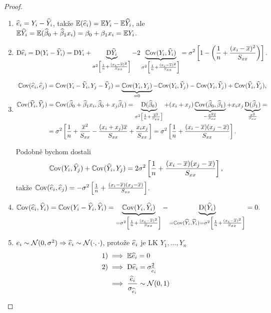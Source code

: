 \begin{proof}
\begin{enumerate}
	\item $\hei = Y_i - \hYi$, takže $\E(\hei) = \E Y_i - \E \hYi$, ale $\E \hYi = \E(\model) = \beta_0 + \beta_1 x_i = \E Y_i$.
	\item
	 $$
		\D \hei = \D (Y_i - \hYi) = \D Y_i + \underbrace{\D \hYi}_{\sigma^2 \left[\frac{1}{n} + \frac{(x_i - \hx)^2}{\Sxx} \right]} - 2 \underbrace{\Cov(Y_i, \hYi)}_{\sigma^2 \left[\frac{1}{n} + \frac{(x_i - \hx)^2}{\Sxx} \right]} = \sigma^2 \left[1 - \left(\frac{1}{n} + \frac{(x_i - \hx)^2}{\Sxx} \right) \right].
	 $$
	\item
	\begin{align*}
		\Cov(\hei, \hej) & = \Cov(Y_i - \hYi, Y_j - \hYj) = \underbrace{\Cov(Y_i, Y_j)}_{ = 0} - \Cov(Y_i, \hYj) - \Cov(Y_i, \hYj) + \Cov(\hYi, \hYj), \\
		\Cov(\hYi, \hYj) & = \Cov(\model, \wbeta_0 + x_j \wbeta_1) = \underbrace{\D(\wbeta_0)}_{\sigma^2 \left[\frac{1}{n} + \frac{\hx^2}{\Sxx} \right]} + (x_i + x_j) \underbrace{\Cov (\wbeta_0,\wbeta_1)}_{-\frac{\sigma^2 \hx}{\Sxx}} + x_i x_j \underbrace{\D(\wbeta_1)}_{\frac{\sigma^2}{\Sxx}} = \\
		& = \sigma^2 \left[\frac{1}{n} + \frac{\hx^2}{\Sxx} - \frac{(x_i + x_j) \hx}{\Sxx} + \frac{x_i x_j}{\Sxx}\right] = \sigma^2 \left[\frac{1}{n} + \frac{(x_i - \hx)(x_j - \hx)}{\Sxx} \right].
	\end{align*}
	
	Podobně bychom dostali
	 $$
		\Cov(Y_i, \hYj) + \Cov(\hYi, Y_j) = 2 \sigma^2 \left[\frac{1}{n} + \frac{(x_i - \hx)(x_j - \hx)}{\Sxx} \right],
	 $$
	takže $\Cov(\hei, \hej) = - \sigma^2 \left[\frac{1}{n} + \frac{(x_i - \hx)(x_j - \hx)}{\Sxx} \right]$.
	\item
	 $$
		\Cov(\hei, \hYi) = \Cov(Y_i - \hYi, \hYi) = \underbrace{\Cov(Y_i, \hYi)}_{ = \sigma^2 \left[\frac{1}{n} + \frac{(x_i - \hx)^2}{\Sxx} \right]} - \underbrace{\D(\hYi)}_{ = \Cov(\hYi, \hYi) = \sigma^2 \left[\frac{1}{n} + \frac{(x_i - \hx)^2}{\Sxx} \right]} = 0.
	 $$
	\item $e_i \sim \Nn \Rightarrow \hei \sim \NN(\cdot, \cdot)$, protože $\hei$ je LK $Y_1,..., Y_n$
	\begin{align*}
		\text{1)} & \implies \E \hei = 0 \\
		\text{2)} & \implies \D \hei = \sigma_{\hei}^2 \\
	 			  & \implies \frac{\hei}{\sigma_{\hei}} \sim \NN(0,1)
	\end{align*}
	\end{enumerate}
\end{proof}

